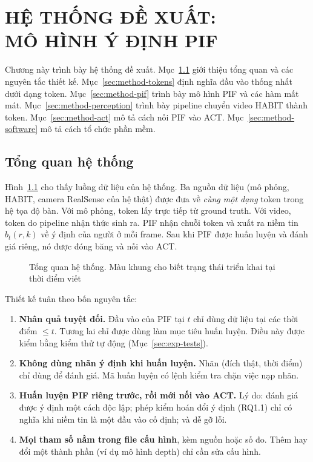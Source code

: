 \chapter[HỆ THỐNG ĐỀ XUẤT: MÔ HÌNH Ý ĐỊNH PIF]{HỆ THỐNG ĐỀ XUẤT:\\MÔ HÌNH Ý ĐỊNH PIF}
\label{chap:method}

Chương này trình bày hệ thống đề xuất. Mục~\ref{sec:method-overview} giới thiệu tổng quan và các nguyên tắc thiết kế. Mục~\ref{sec:method-tokens} định nghĩa đầu vào thống nhất dưới dạng token. Mục~\ref{sec:method-pif} trình bày mô hình PIF và các hàm mất mát. Mục~\ref{sec:method-perception} trình bày pipeline chuyển video HABIT thành token. Mục~\ref{sec:method-act} mô tả cách nối PIF vào ACT. Mục~\ref{sec:method-software} mô tả cách tổ chức phần mềm.

\section{Tổng quan hệ thống}
\label{sec:method-overview}

Hình~\ref{fig:system} cho thấy luồng dữ liệu của hệ thống. Ba nguồn dữ liệu (mô phỏng, HABIT, camera RealSense của hệ thật) được đưa về \emph{cùng một dạng} token trong hệ tọa độ bàn. Với mô phỏng, token lấy trực tiếp từ ground truth. Với video, token do pipeline nhận thức sinh ra. PIF nhận chuỗi token và xuất ra niềm tin $b_t(r,k)$ về ý định của người ở mỗi frame. Sau khi PIF được huấn luyện và đánh giá riêng, nó được đóng băng và nối vào ACT.

\begin{figure}[H]
  \centering
  \fitfig{}
  \caption{Tổng quan hệ thống. Màu khung cho biết trạng thái triển khai tại thời điểm viết}
  \label{fig:system}
\end{figure}

Thiết kế tuân theo bốn nguyên tắc:
\begin{enumerate}
  \item \textbf{Nhân quả tuyệt đối.} Đầu vào của PIF tại $t$ chỉ dùng dữ liệu tại các thời điểm $\le t$. Tương lai chỉ được dùng làm mục tiêu huấn luyện. Điều này được kiểm bằng kiểm thử tự động (Mục~\ref{sec:exp-tests}).
  \item \textbf{Không dùng nhãn ý định khi huấn luyện.} Nhãn (đích thật, thời điểm) chỉ dùng để đánh giá. Mã huấn luyện có lệnh kiểm tra chặn việc nạp nhãn.
  \item \textbf{Huấn luyện PIF riêng trước, rồi mới nối vào ACT.} Lý do: đánh giá được ý định một cách độc lập; phép kiểm hoán đổi ý định (RQ1.1) chỉ có nghĩa khi niềm tin là một đầu vào cố định; và dễ gỡ lỗi.
  \item \textbf{Mọi tham số nằm trong file cấu hình}, kèm nguồn hoặc số đo. Thêm hay đổi một thành phần (ví dụ mô hình depth) chỉ cần sửa cấu hình.
\end{enumerate}

